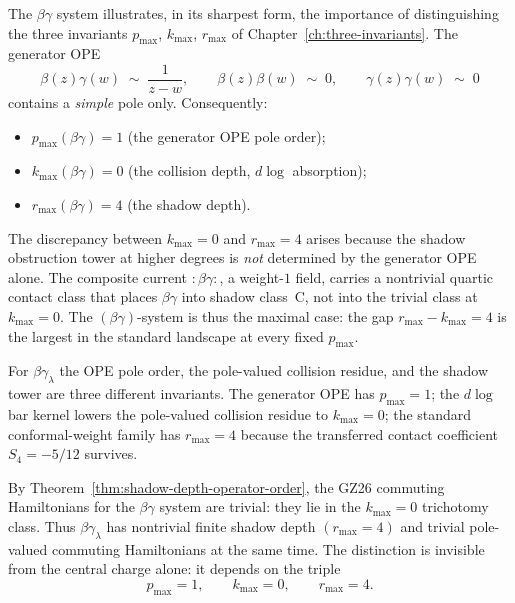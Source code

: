The $\beta\gamma$ system illustrates, in its sharpest form, the
importance of distinguishing the three invariants $p_{\max}$,
$k_{\max}$, $r_{\max}$ of
Chapter~\ref{ch:three-invariants}. The generator OPE
\[
\beta(z)\gamma(w) \;\sim\; \frac{1}{z-w},
\qquad
\beta(z)\beta(w) \;\sim\; 0,
\qquad
\gamma(z)\gamma(w) \;\sim\; 0
\]
contains a \emph{simple} pole only. Consequently:
\begin{itemize}
\item $p_{\max}(\beta\gamma) = 1$ (the generator OPE pole order);
\item $k_{\max}(\beta\gamma) = 0$ (the collision depth,
 $d\log$ absorption);
\item $r_{\max}(\beta\gamma) = 4$ (the shadow depth).
\end{itemize}
The discrepancy between $k_{\max} = 0$ and $r_{\max} = 4$ arises
because the shadow obstruction tower at higher degrees is \emph{not}
determined by the generator OPE alone. The composite current
$:\!\beta\gamma\!:$, a weight-$1$ field, carries a nontrivial quartic
contact class that places $\beta\gamma$ into shadow class~C, not into
the trivial class at $k_{\max} = 0$. The $(\beta\gamma)$-system is
thus the maximal case: the gap $r_{\max} - k_{\max} = 4$ is the
largest in the standard landscape at every fixed $p_{\max}$.

\begin{remark}
\label{warn:bg-depth-gap}
For $\beta\gamma_\lambda$ the OPE pole order, the pole-valued
collision residue, and the shadow tower are three different
invariants. The generator OPE has $p_{\max}=1$; the $d\log$
bar kernel lowers the pole-valued collision residue to
$k_{\max}=0$; the standard conformal-weight family has
$r_{\max}=4$ because the transferred contact coefficient
$S_4=-5/12$ survives.
\end{remark}

\begin{remark}
\label{rem:bg-gz26-trivial}
By Theorem~\ref{thm:shadow-depth-operator-order}, the
GZ\textup{26} commuting Hamiltonians for the $\beta\gamma$ system are
trivial: they lie in the $k_{\max}=0$ trichotomy class. Thus
$\beta\gamma_\lambda$ has nontrivial finite shadow depth
$(r_{\max}=4)$ and trivial pole-valued commuting Hamiltonians at the
same time. The distinction is invisible from the central charge alone:
it depends on the triple
\[
p_{\max}=1,\qquad k_{\max}=0,\qquad r_{\max}=4 .
\]
\end{remark}

